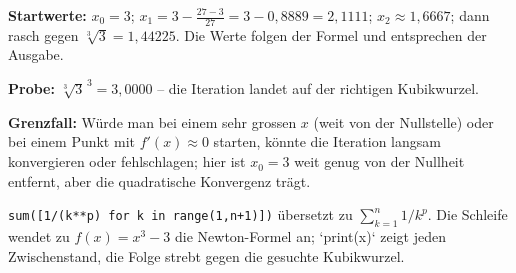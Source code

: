 \begin{kontrolle}
\textbf{Startwerte:} $x_0=3$; $x_1=3-\frac{27-3}{27}=3-0{,}8889=2{,}1111$;
$x_2\approx1{,}6667$; dann rasch gegen $\sqrt[3]{3}=1{,}44225$. Die Werte
folgen der Formel und entsprechen der Ausgabe. \checkmark

\textbf{Probe:} $\sqrt[3]{3}^{\,3}=3{,}0000$ -- die Iteration landet auf
der richtigen Kubikwurzel. \checkmark

\textbf{Grenzfall:} Würde man bei einem sehr grossen $x$ (weit von der
Nullstelle) oder bei einem Punkt mit $f'(x)\approx0$ starten, könnte die
Iteration langsam konvergieren oder fehlschlagen; hier ist $x_0=3$ weit
genug von der Nullheit entfernt, aber die quadratische Konvergenz trägt.
\checkmark
\end{kontrolle}

\begin{merksatz}
\texttt{sum([1/(k**p) for k in range(1,n+1)])} übersetzt zu
$\sum_{k=1}^{n}1/k^p$. Die Schleife wendet zu $f(x)=x^3-3$ die
Newton-Formel an; `print(x)` zeigt jeden Zwischenstand, die Folge strebt
gegen die gesuchte Kubikwurzel.
\end{merksatz}
